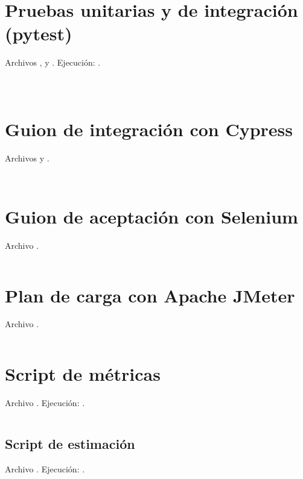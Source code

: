 
\section{Pruebas unitarias y de integración (pytest)}\label{ap:unitarias}

Archivos ,  y . Ejecución: .

\inputminted{python}{../../backend/tests/conftest.py}
\inputminted{python}{../../backend/tests/test_unitarias.py}
\inputminted{python}{../../backend/tests/test_integracion.py}

\section{Guion de integración con Cypress}\label{ap:cypress}

Archivos  y .

\inputminted{javascript}{../../cypress.config.js}
\inputminted{javascript}{../../cypress/e2e/integracion.cy.js}

\section{Guion de aceptación con Selenium}\label{ap:selenium}

Archivo .

\inputminted{python}{../../tests/aceptacion_selenium.py}

\section{Plan de carga con Apache JMeter}\label{ap:jmeter}

Archivo .

\inputminted{xml}{../../tests/carga/shiftcash.jmx}

\section{Script de métricas}\label{ap:metricas}

Archivo . Ejecución: .

\inputminted{python}{../scripts/metricas.py}

\subsection*{Script de estimación}\label{ap:estimacion}

Archivo . Ejecución: .

\inputminted{python}{../scripts/estimacion.py}
